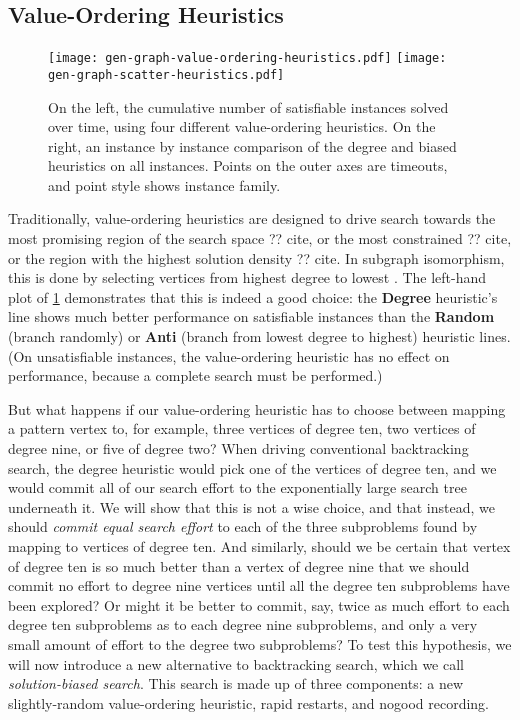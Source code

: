 \documentclass[runningheads]{llncs}
\begin{document}
\subsection{Value-Ordering Heuristics}

\begin{figure}[tb]
    \texttt{[image: gen-graph-value-ordering-heuristics.pdf]}
    \hfill
    \texttt{[image: gen-graph-scatter-heuristics.pdf]}

    \caption{On the left, the cumulative number of satisfiable instances solved over time, using
    four different value-ordering heuristics. On the right, an instance by instance comparison of
    the degree and biased heuristics on all instances. Points on the outer axes are timeouts, and
    point style shows instance family.}
    \label{figure:value-ordering-heuristics}
\end{figure}

Traditionally, value-ordering heuristics are designed to drive search towards the most promising
region of the search space ?? cite, or the most constrained ?? cite, or the region with the highest solution
density ?? cite. In subgraph isomorphism, this is done by selecting vertices from highest degree to
lowest \cite{DBLP:journals/jair/McCreeshPST18}. The left-hand plot of
\cref{figure:value-ordering-heuristics} demonstrates that this is indeed a good choice: the
\textbf{Degree} heuristic's line shows much better performance on satisfiable instances than the
\textbf{Random} (branch randomly) or \textbf{Anti} (branch from lowest degree to highest) heuristic
lines. (On unsatisfiable instances, the value-ordering heuristic has no effect on performance,
because a complete search must be performed.)

But what happens if our value-ordering heuristic has to choose between mapping a pattern vertex to,
for example, three vertices of degree ten, two vertices of degree nine, or five of degree two? When
driving conventional backtracking search, the degree heuristic would pick one of the vertices of
degree ten, and we would commit all of our search effort to the exponentially large search tree
underneath it.  We will show that this is not a wise choice, and that instead, we should \emph{commit
equal search effort} to each of the three subproblems found by mapping to vertices of degree ten.
And similarly, should we be certain that vertex of degree ten is so much better than a vertex of
degree nine that we should commit no effort to degree nine vertices until all the degree ten
subproblems have been explored? Or might it be better to commit, say, twice as much effort to each
degree ten subproblems as to each degree nine subproblems, and only a very small amount of effort to
the degree two subproblems?  To test this hypothesis, we will now introduce a new alternative to
backtracking search, which we call \emph{solution-biased search}.  This search is made up of three
components: a new slightly-random value-ordering heuristic, rapid restarts, and nogood recording.
\end{document}
